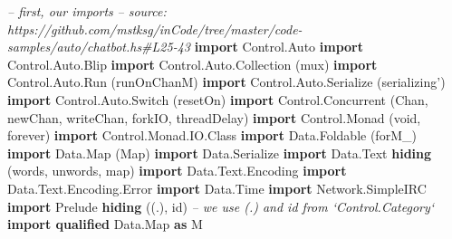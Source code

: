\documentclass[]{article}
\newenvironment{Shaded}{}{}
\newcommand{\KeywordTok}[1]{\textcolor[rgb]{0.00,0.44,0.13}{\textbf{{#1}}}}
\newcommand{\DataTypeTok}[1]{\textcolor[rgb]{0.56,0.13,0.00}{{#1}}}
\newcommand{\CommentTok}[1]{\textcolor[rgb]{0.38,0.63,0.69}{\textit{{#1}}}}
\newcommand{\NormalTok}[1]{{#1}}
\begin{document}
\begin{Shaded}
\begin{Highlighting}[]
\CommentTok{-- first, our imports}
\CommentTok{-- source: https://github.com/mstksg/inCode/tree/master/code-samples/auto/chatbot.hs#L25-43}
\KeywordTok{import }\DataTypeTok{Control.Auto}
\KeywordTok{import }\DataTypeTok{Control.Auto.Blip}
\KeywordTok{import }\DataTypeTok{Control.Auto.Collection}  \NormalTok{(mux)}
\KeywordTok{import }\DataTypeTok{Control.Auto.Run}         \NormalTok{(runOnChanM)}
\KeywordTok{import }\DataTypeTok{Control.Auto.Serialize}   \NormalTok{(serializing')}
\KeywordTok{import }\DataTypeTok{Control.Auto.Switch}      \NormalTok{(resetOn)}
\KeywordTok{import }\DataTypeTok{Control.Concurrent}       \NormalTok{(}\DataTypeTok{Chan}\NormalTok{, newChan, writeChan, forkIO, threadDelay)}
\KeywordTok{import }\DataTypeTok{Control.Monad}            \NormalTok{(void, forever)}
\KeywordTok{import }\DataTypeTok{Control.Monad.IO.Class}
\KeywordTok{import }\DataTypeTok{Data.Foldable}            \NormalTok{(forM_)}
\KeywordTok{import }\DataTypeTok{Data.Map}                 \NormalTok{(}\DataTypeTok{Map}\NormalTok{)}
\KeywordTok{import }\DataTypeTok{Data.Serialize}
\KeywordTok{import }\DataTypeTok{Data.Text} \KeywordTok{hiding}         \NormalTok{(words, unwords, map)}
\KeywordTok{import }\DataTypeTok{Data.Text.Encoding}
\KeywordTok{import }\DataTypeTok{Data.Text.Encoding.Error}
\KeywordTok{import }\DataTypeTok{Data.Time}
\KeywordTok{import }\DataTypeTok{Network.SimpleIRC}
\KeywordTok{import }\DataTypeTok{Prelude} \KeywordTok{hiding}           \NormalTok{((.), id)   }\CommentTok{-- we use (.) and id from `Control.Category`}
\KeywordTok{import qualified} \DataTypeTok{Data.Map}       \KeywordTok{as} \DataTypeTok{M}
\end{Highlighting}
\end{Shaded}
\end{document}
